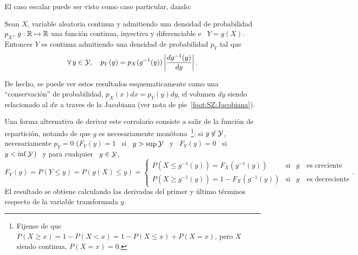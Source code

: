 El caso escalar puede ser visto como caso particular, dando:
%
\begin{corolario}
  Sean  $X$,   variable  aleatoria  continua   y  admitiendo  una   densidad  de
  probabilidad $p_X$, $g:\mathbb{R} \mapsto  \mathbb{R}$ una funci\'on continua, inyectiva
  y  diferenciable e  \ $Y  = g(X)$.   Entonces $Y$  es continua  admitiendo una
  densidad de probabilidad $p_Y$ tal que
  \[
  \forall  \,   y  \in  \mathcal{Y},   \quad  p_Y(y)  =  p_X(g^{-1}(y))   \left|  \frac{d
      g^{-1}(y)}{dy} \right|.
  \]
\end{corolario}
%
\noindent  De hecho,  se puede  ver estos  resultados esquematicamente  como una
``conservaci\'on'' de  probabilidad, $p_X(x)  dx = p_Y(y)  dy$, el  volumen $dy$
siendo   relacionado  al  $dx$   a  traves   de  la   Jacobiana  (ver   nota  de
pie~\ref{foot:SZ:Jacobiana}).

Una  forma  alternativa  de derivar  este  corrolario  consiste  a salir  de  la
funci\'on   de   repartici\'on,   notando   de   que   $g$   es   necesariamente
mon\'otona~\footnote{Fijense de que $P(X \ge x) = 1 -  P(X < x) = 1 - P(X \le x) +
  P(X =  x)$, pero $X$ siendo  continua, $ P(X =  x) = 0$.}: si  $y \not\in \mathcal{Y}$,
necesariamente $p_Y = 0$ ($F_Y(y) = 1$ \ si \ $y > \sup \mathcal{Y}$ \ y \ $F_Y(y) = 0$ \
si \ $y < \inf \mathcal{Y}$) \ y para cualquier \ $y \in \mathcal{Y}$,
%
\[
F_Y(y) = P(Y \le y) = P(g(X) \le y) =
\left\{\begin{array}{lll}
P(X \le g^{-1}(y)) = F_X(g^{-1}(y)) & \mbox{si} & g \quad \mbox{es creciente}\\[2.5mm]
%
P(X \ge g^{-1}(y)) = 1 - F_X(g^{-1}(y)) & \mbox{si} & g \quad \mbox{es decreciente}
\end{array}\right..
\]
%
El  resultado  se  obtiene  calculando  las  derivadas  del  primer  y  \'ultimo
t\'erminos respecto de la variable transformada $y$.

